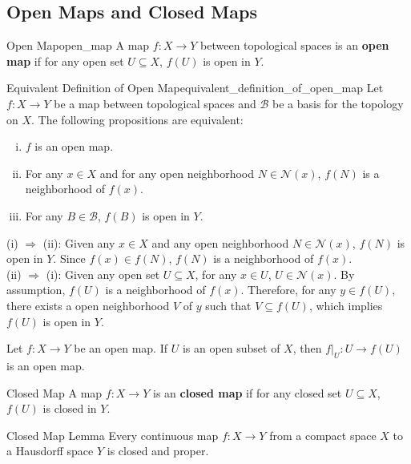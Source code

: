 \documentclass{report}
\begin{document}
\subsection{Open Maps and Closed Maps}

\begin{definition}{Open Map}{open_map}
	A map $f:X\to Y$ between topological spaces is an \textbf{open map} if for any open set $U\subseteq X$, $f(U)$ is open in $Y$.
\end{definition}


\begin{proposition}{Equivalent Definition of Open Map}{equivalent_definition_of_open_map}
	Let $f:X\to Y$ be a map between topological spaces and $\mathcal{B}$ be a basis for the topology on $X$. The following propositions are equivalent:
	\begin{enumerate}[(i)]
		\item $f$ is an open map.
		\item For any $x\in X$ and for any open neighborhood $N\in\mathcal{N}(x)$, $f(N)$ is a neighborhood of $f(x)$.
		\item For any $B\in\mathcal{B}$, $f(B)$ is open in $Y$.
	\end{enumerate}
\end{proposition}
\begin{prf}
	(i) $\Rightarrow$ (ii): Given any $x\in X$ and any open neighborhood $N\in\mathcal{N}(x)$, $f(N)$ is open in $Y$. Since $f(x)\in f(N)$, $f(N)$ is a neighborhood of $f(x)$.\\
	(ii) $\Rightarrow$ (i): Given any open set $U\subseteq X$, for any $x\in U$, $U\in\mathcal{N}(x)$. By assumption, $f(U)$ is a neighborhood of $f(x)$. Therefore, for any $y\in f(U)$, there exists a open neighborhood $V$ of $y$ such that $V\subseteq f(U)$, which implies $f(U)$ is open in $Y$.
\end{prf}

\begin{proposition}{}{}
	Let $f:X\to Y$ be an open map. If $U$ is an open subset of $X$, then $f|_U:U\to f(U)$ is an open map.
\end{proposition}


\begin{definition}{Closed Map}{}
	A map $f:X\to Y$ is an \textbf{closed map} if for any closed set $U\subseteq X$, $f(U)$ is closed in $Y$.
\end{definition}

\begin{lemma}{Closed Map Lemma}{}
	Every continuous map $f: X \rightarrow Y$ from a compact space $X$ to a Hausdorff space $Y$ is closed and proper.
\end{lemma}
\end{document}
